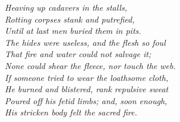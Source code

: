 {\emph{Heaving up cadavers in the stalls,}\\
\emph{Rotting corpses stank and putrefied,}\\
\emph{Until at last men buried them in pits.}\\
\emph{The hides were useless, and the flesh so foul}\\
\emph{That fire and water could not salvage it;}\\
\emph{None could shear the fleece, nor touch the web.}\\
\emph{If someone tried to wear the loathsome cloth,}\\
\emph{He burned and blistered, rank repulsive sweat}\\
\emph{Poured off his fetid limbs; and, soon enough,}\\
\emph{His stricken body felt the sacred fire.}\\


}
